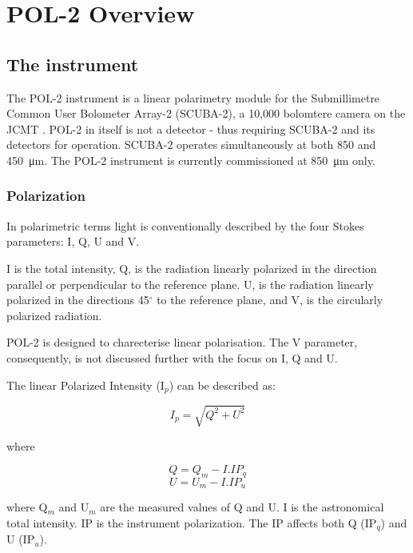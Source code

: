 \chapter{POL-2 Overview}
\label{sec:pol2}
\section{The instrument}

The POL-2 instrument is a linear polarimetry module for the
Submillimetre Common User Bolometer Array-2 (SCUBA-2), a 10,000
bolomtere camera on the JCMT \cite{Friberg}\cite{Bastien2011}.
POL-2 in itself is not a detector - thus requiring SCUBA-2
and its detectors for operation. SCUBA-2 operates
simultaneously at both 850 and \SI{450}{\micro\metre}. The POL-2
instrument is currently commissioned at \SI{850}{\micro\metre} only.


\subsection*{Polarization}

In polarimetric terms light is conventionally 
described by the four Stokes parameters: I, Q, U and V.


I is the total intensity, Q, is the radiation linearly polarized in the
direction parallel or perpendicular to the reference plane. U, is the
radiation linearly polarized in the directions 45$^{\circ }$ to the
reference plane, and V, is the circularly polarized radiation.

POL-2 is designed to charecterise linear polarisation. 
The V parameter, consequently, is not discussed further
with the focus on I, Q and U.

The linear Polarized Intensity (I$_{p}$) can be described as:

\begin{equation}
I_{p} = \sqrt{Q^{2}+U^{2}}
\end{equation}

where

\begin{equation}
Q = Q_{m} - I . IP_{q}
\end{equation}
\begin{equation}
U = U_{m} - I . IP_{u}
\end{equation}

where Q$_{m}$ and U$_{m}$ are the measured values of Q and U.
I is the astronomical total intensity.
IP is the instrument polarization. The IP affects both Q
(IP$_{q}$) and U (IP$_{u}$).


